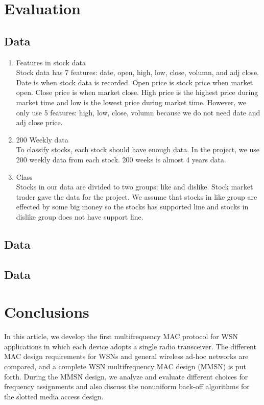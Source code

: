 \documentclass[prodmode,acmtecs]{acmsmall} %
\begin{document}
\newpage
\section{Evaluation}
\subsection{Data}
\begin{enumerate}
	\item Features in stock data\\
		Stock data has 7 features: date, open, high, low, close, volumn, and adj close. Date is when stock data is recorded. Open price is stock price when market open. Close price is when market close. High price is the highest price during market time and low is the lowest price during market time. However, we only use 5 features: high, low, close, volumn because we do not need date and adj close price. 
		
	\item 200 Weekly data\\
		To classify stocks, each stock should have enough data. In the project, we use 200 weekly data from each stock. 200 weeks is almost 4 years data.
		
	\item Class\\
		Stocks in our data are divided to two groups: like and dislike. Stock market trader gave the data for the project. We assume that stocks in like group are effected by some big money so the stocks has supported line and stocks in dislike group does not have support line. 
\end{enumerate}

\subsection{Data}

\subsection{Data}

\newpage
\section{Conclusions}
In this article, we develop the first multifrequency MAC protocol for
WSN applications in which each device adopts a
single radio transceiver. The different MAC design requirements for
WSNs and general wireless ad-hoc networks are
compared, and a complete WSN multifrequency MAC design (MMSN) is
put forth. During the MMSN design, we analyze and evaluate different
choices for frequency assignments and also discuss the nonuniform
back-off algorithms for the slotted media access design.
\\
\\
\\
\end{document}
